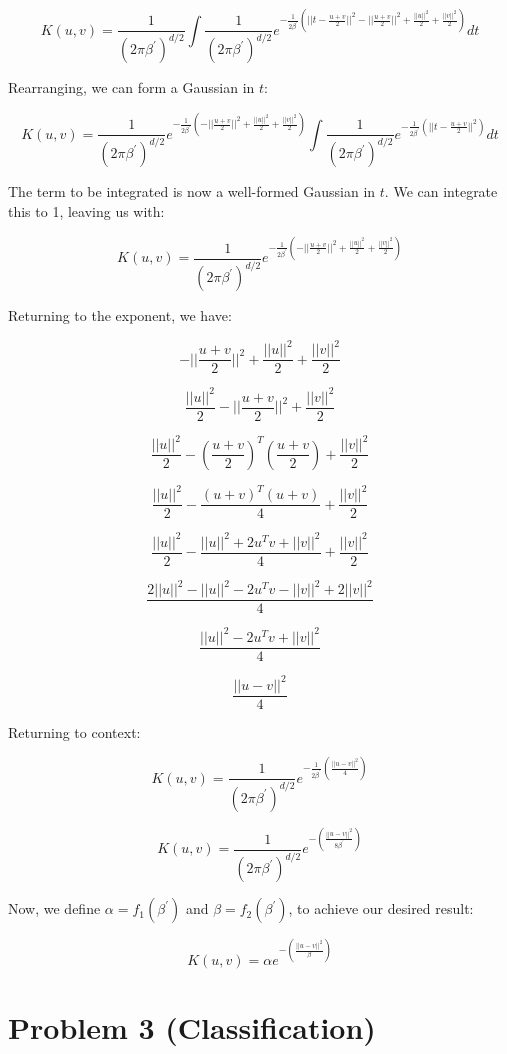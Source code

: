 \documentclass[11pt]{article}
\begin{document}
\[
K(u, v) = \frac{1}{(2\pi\beta^\prime)^{d/2}} \int \frac{1}{(2\pi\beta^\prime)^{d/2}}e^{-\frac{1}{2\beta^\prime}(||t - \frac{u + v}{2}||^2 - ||\frac{u+v}{2}||^2 + \frac{||u||^2}{2} + \frac{||v||^2}{2})} dt
\]

Rearranging, we can form a Gaussian in $t$:

\[
K(u, v) = \frac{1}{(2\pi\beta^\prime)^{d/2}}e^{-\frac{1}{2\beta^\prime}(- ||\frac{u+v}{2}||^2 + \frac{||u||^2}{2} + \frac{||v||^2}{2})} \int \frac{1}{(2\pi\beta^\prime)^{d/2}}e^{-\frac{1}{2\beta^\prime}(||t - \frac{u + v}{2}||^2)} dt
\]

The term to be integrated is now a well-formed Gaussian in $t$. We can integrate this to 1, leaving us with:

\[
K(u, v) = \frac{1}{(2\pi\beta^\prime)^{d/2}}e^{-\frac{1}{2\beta^\prime}(- ||\frac{u+v}{2}||^2 + \frac{||u||^2}{2} + \frac{||v||^2}{2})}
\]

Returning to the exponent, we have:

\[
- ||\frac{u+v}{2}||^2 + \frac{||u||^2}{2} + \frac{||v||^2}{2}
\]

\[
\frac{||u||^2}{2} - ||\frac{u+v}{2}||^2  + \frac{||v||^2}{2}
\]

\[
\frac{||u||^2}{2} - (\frac{u+v}{2})^T(\frac{u+v}{2})  + \frac{||v||^2}{2}
\]

\[
\frac{||u||^2}{2} - \frac{(u+v)^T(u+v)}{4} + \frac{||v||^2}{2}
\]

\[
\frac{||u||^2}{2} - \frac{||u||^2 + 2u^Tv + ||v||^2}{4}  + \frac{||v||^2}{2}
\]

\[
\frac{2||u||^2 - ||u||^2 - 2u^Tv - ||v||^2 + 2||v||^2}{4}
\]

\[
\frac{||u||^2 - 2u^Tv  + ||v||^2}{4}
\]

\[
\frac{||u - v||^2}{4}
\]

Returning to context:

\[
K(u, v) = \frac{1}{(2\pi\beta^\prime)^{d/2}}e^{-\frac{1}{2\beta^\prime}(\frac{||u - v||^2}{4})}
\]

\[
K(u, v) = \frac{1}{(2\pi\beta^\prime)^{d/2}}e^{-(\frac{||u - v||^2}{8\beta^\prime})}
\]

Now, we define $\alpha = f_1(\beta^\prime)$ and $\beta = f_2(\beta^\prime)$, to achieve our desired result:

\[
K(u, v) = \alpha e^{-(\frac{||u - v||^2}{\beta})}
\]

\section*{Problem 3 (Classification)}
\end{document}
